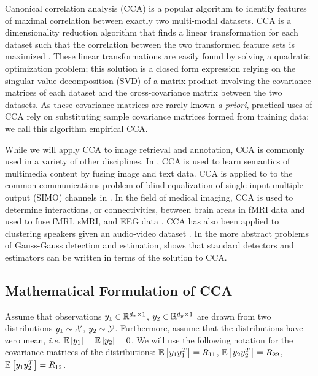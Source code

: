 Canonical correlation analysis (CCA) is a popular algorithm to identify features of
maximal correlation between exactly two multi-modal datasets. CCA is a dimensionality
reduction algorithm that finds a linear transformation for each dataset such that the
correlation between the two transformed feature sets is maximized
\cite{hotelling1936relations}. These linear transformations are easily found by solving a
quadratic optimization problem; this solution is a closed form expression relying on the
singular value decomposition (SVD) of a matrix product involving the covariance matrices
of each dataset and the cross-covariance matrix between the two datasets. As these covariance
matrices are rarely known \textit{a priori}, practical uses of CCA rely on substituting
sample covariance matrices formed from training data; we call this algorithm empirical CCA.

While we will apply CCA to image retrieval and annotation, CCA is commonly used in a
variety of other disciplines. In \cite{hardoon2004canonical}, CCA is used to learn
semantics of multimedia content by fusing image and text data. CCA is applied to to the
common communications problem of blind equalization of single-input multiple-output (SIMO)
channels in \cite{via2005canonical}. In the field of medical imaging, CCA is used to
determine interactions, or connectivities, between brain areas in fMRI data
\cite{deleus2011functional} and used to fuse fMRI, sMRI, and EEG data
\cite{correa2010canonical}. CCA has also been applied to clustering speakers given an
audio-video dataset \cite{chaudhuri2009multi}. In the more abstract problems of
Gauss-Gauss detection and estimation, \cite{pezeshki2006canonical} shows that standard
detectors and estimators can be written in terms of the solution to CCA.


\subsection{Mathematical Formulation of CCA}\label{sec:cca_form}
Assume that observations $y_1\in\mathbb{R}^{d_x\times 1}$, $y_2\in\mathbb{R}^{d_y\times 1}$
are drawn from two distributions $y_1\sim\mathcal{X}$,
$y_2\sim\mathcal{Y}$. Furthermore, assume that the distributions have zero mean,
\textit{i.e.} $\mathbb{E}\left[{y_1}\right]=\mathbb{E}\left[{y_2}\right]=0$. We will use the following notation for the covariance
matrices of the distributions: $\mathbb{E}\left[{y_1y_1^T}\right]=R_{11}$, $\mathbb{E}\left[{y_2y_2^T}\right]=R_{22}$,
$\mathbb{E}\left[{y_1y_2^T}\right]=R_{12}$.


